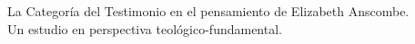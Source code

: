 \begin{titlepage}

\huge La Categoría del Testimonio en el pensamiento de Elizabeth Anscombe.\\
\large Un estudio en perspectiva teológico-fundamental.

\end{titlepage}